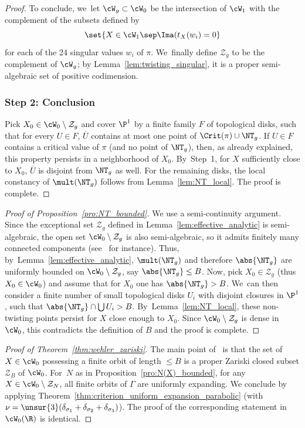 \begin{proof}
To conclude, we~let $ \cW_g\subset \cW_0$ be
the intersection of $ \cW_1$ with the complement of the subsets defined by
\begin{equation*}
\set{X\in \cW_1\sep \Ima(t_X(w_i) = 0}
\end{equation*} for each of the 24 singular values $w_i$ of $\pi$. We~finally define $\mathcal Z_g$ to be the complement of $ \cW_g$; by Lemma~\ref{lem:twisting_singular}, it is a proper
semi-algebraic set of positive codimension.

\subsubsection*{Step 2: Conclusion}
Pick $X_0\in \cW_0\setminus \mathcal Z_g$ and cover $\P^1$ by a finite family $F$ of
topological disks, such that for every $U\in F$,
$\overline U$ contains at most one point of $\Crit(\pi)\cup \NT_g$.
If $U\in F$ contains a critical value of $\pi$ (and no point of $\NT_g$),
then, as already explained, this property persists in a neighborhood of $X_0$. By~Step~1, for
$X$ sufficiently
close to $X_0$, $\overline U$ is disjoint from $\NT_g$ as well. For the remaining disks, the local constancy of $\mult(\NT_g)$ follows from Lemma~\ref{lem:NT_local}. The proof is complete.
\end{proof}

\begin{proof}[Proof of Proposition~\ref{pro:NT_bounded}]
We use a semi-continuity argument.
Since the exceptional set $\mathcal Z_g$ defined in Lemma~\ref{lem:effective_analytic} is semi-algebraic,
the open set $\cW_0\setminus \mathcal Z_g$ is also semi-algebraic, so it
admits finitely many connected components (see~\cite[Cor.\,2.7]{bierstone-milman:ihes} for instance).
Thus, by~Lemma~\ref{lem:effective_analytic}, $\mult(\NT_g)$ and therefore $\abs{\NT_g}$
are uniformly bounded
on $\cW_0\setminus \mathcal Z_g$, say $\abs{\NT_g}\leq B$. Now, pick $X_0\in \mathcal Z_g$ (thus $X_0\in \cW_0$) and assume
that for $X_0$ one has $\abs{\NT_g}>B$. We~can then consider a finite number of small topological
disks $U_i$ with disjoint closures in $\P^1$, such that $\abs{\NT_g}\cap \bigcup U_i>B$. By~Lemma~\ref{lem:NT_local}, these non-twisting points persist for
$X$ close enough to $X_0$. Since $\cW_0\setminus \mathcal Z_g$ is dense in~$\cW_0$, this
contradicts the definition of $B$ and the proof is complete.
\end{proof}

\begin{proof}[Proof of Theorem~\ref{thm:wehler_zariski}]
The main point of~\cite[Th.\,A]{finite_orbits} is
that the set of $X\in \cW_0$ possessing a finite orbit of length $\leq B$ is a
proper Zariski closed subset $\mathcal Z_B$ of $ \cW_0$. For~$N$ as in
Proposition~\ref{pro:N(X)_bounded}, for
any $X\in \cW_0\setminus \mathcal Z_N$, all finite orbits of $\Gamma$ are uniformly expanding. We
conclude by applying Theorem~\ref{thm:criterion_uniform_expansion_parabolic} (with $\nu = \unsur{3}(\delta_{\sigma_1}+ \delta_{\sigma_2}+\delta_{\sigma_3})$). The proof of the corresponding statement in $ \cW_0(\R)$ is identical.
\end{proof}

